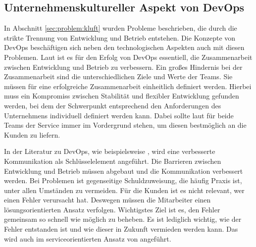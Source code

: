 \subsection{Unternehmenskultureller Aspekt von DevOps}
\label{sec:devops:firmenkultur}
In Abschnitt \ref{sec:problem:kluft} wurden Probleme beschrieben, die durch die strikte Trennung von Entwicklung und Betrieb entstehen. Die Konzepte von DevOps beschäftigen sich neben den technologischen Aspekten auch mit diesen Problemen. Laut \cite{walls2013} ist es für den Erfolg von DevOps essentiell, die Zusammenarbeit zwischen Entwicklung und Betrieb zu verbessern. Ein großes Hindernis bei der Zusammenarbeit sind die unterschiedlichen Ziele und Werte der Teams. Sie müssen für eine erfolgreiche Zusammenarbeit einheitlich definiert werden. Hierbei muss ein Kompromiss zwischen Stabilität und flexibler Entwicklung gefunden werden, bei dem der Schwerpunkt entsprechend den Anforderungen des Unternehmens individuell definiert werden kann. Dabei sollte laut \cite{wolff2014} für beide Teams der Service immer im Vordergrund stehen, um diesen bestmöglich an die Kunden zu liefern.

In der Literatur zu DevOps, wie beispielsweise \cite{humble2014, peschlow2012, brown2014}, wird eine verbesserte Kommunikation als Schlüsselelement angeführt. Die Barrieren zwischen Entwicklung und Betrieb müssen abgebaut und die Kommunikation verbessert werden. Bei Problemen ist gegenseitige Schuldzuweisung, die häufig Praxis ist, unter allen Umständen zu vermeiden. Für die Kunden ist es nicht relevant, wer einen Fehler verursacht hat. Deswegen müssen die Mitarbeiter einen lösungsorientierten Ansatz verfolgen. Wichtigstes Ziel ist es, den Fehler gemeinsam so schnell wie möglich zu beheben. Es ist lediglich wichtig, wie der Fehler entstanden ist und wie dieser in Zukunft vermieden werden kann. Das wird auch im serviceorientierten Ansatz von \cite{wolff2014} angeführt. 

